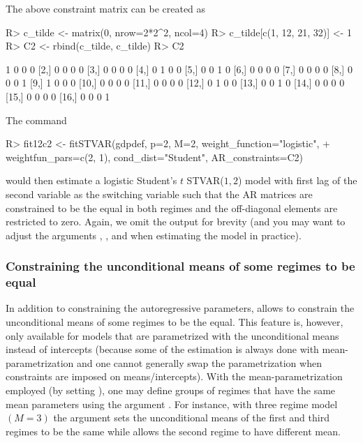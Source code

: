 \documentclass[nojss]{jss}
\begin{document}
The above constraint matrix can be created as
%
\begin{CodeChunk}
\begin{CodeInput}
R> c_tilde <- matrix(0, nrow=2*2^2, ncol=4)
R> c_tilde[c(1, 12, 21, 32)] <- 1
R> C2 <- rbind(c_tilde, c_tilde)
R> C2
\end{CodeInput}
\begin{CodeOutput}
      [,1] [,2] [,3] [,4]
 [1,]    1    0    0    0
 [2,]    0    0    0    0
 [3,]    0    0    0    0
 [4,]    0    1    0    0
 [5,]    0    0    1    0
 [6,]    0    0    0    0
 [7,]    0    0    0    0
 [8,]    0    0    0    1
 [9,]    1    0    0    0
[10,]    0    0    0    0
[11,]    0    0    0    0
[12,]    0    1    0    0
[13,]    0    0    1    0
[14,]    0    0    0    0
[15,]    0    0    0    0
[16,]    0    0    0    1
\end{CodeOutput}
\end{CodeChunk}
%
The command
\begin{CodeChunk}
\begin{CodeInput}
R> fit12c2 <- fitSTVAR(gdpdef, p=2, M=2, weight_function="logistic",
+    weightfun_pars=c(2, 1), cond_dist="Student", AR_constraints=C2)
\end{CodeInput}
\end{CodeChunk}
would then estimate a logistic Student's $t$ STVAR($1,2$) model with first lag of the second variable as the switching variable such that the AR matrices are constrained to be the equal in both regimes and the off-diagonal elements are restricted to zero. Again, we omit the output for brevity (and you may want to adjust the arguments , , and  when estimating the model in practice).


\subsubsection{Constraining the unconditional means of some regimes to be equal}
In addition to constraining the autoregressive parameters,  allows to constrain the unconditional means of some regimes to be the equal. This feature is, however, only available for models that are parametrized with the unconditional means instead of intercepts (because some of the estimation is always done with mean-parametrization and one cannot generally swap the parametrization when constraints are imposed on means/intercepts). With the mean-parametrization employed (by setting ), one may define groups of regimes that have the same mean parameters using the argument . For instance, with three regime model $(M=3)$ the argument  sets the unconditional means of the first and third regimes to be the same while allows the second regime to have different mean.
\end{document}
